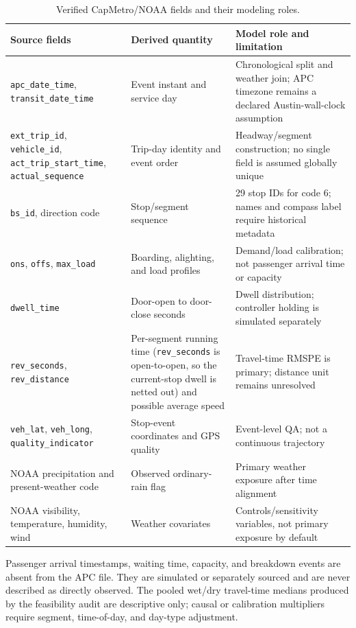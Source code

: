 \begin{table}[htbp]
\centering
\caption{Verified CapMetro/NOAA fields and their modeling roles.}
\label{tab:field-mapping-texas}
\small
\renewcommand{\arraystretch}{1.2}
\begin{tabularx}{\textwidth}{p{}p{}X}
\toprule
\textbf{Source fields} & \textbf{Derived quantity} & \textbf{Model role and limitation} \\
\midrule
\texttt{apc\_date\_time}, \texttt{transit\_date\_time} & Event instant and service day & Chronological split and weather join; APC timezone remains a declared Austin-wall-clock assumption \\
\texttt{ext\_trip\_id}, \texttt{vehicle\_id}, \texttt{act\_trip\_start\_time}, \texttt{actual\_sequence} & Trip-day identity and event order & Headway/segment construction; no single field is assumed globally unique \\
\texttt{bs\_id}, direction code & Stop/segment sequence & 29 stop IDs for code 6; names and compass label require historical metadata \\
\texttt{ons}, \texttt{offs}, \texttt{max\_load} & Boarding, alighting, and load profiles & Demand/load calibration; not passenger arrival time or capacity \\
\texttt{dwell\_time} & Door-open to door-close seconds & Dwell distribution; controller holding is simulated separately \\
\texttt{rev\_seconds}, \texttt{rev\_distance} & Per-segment running time (\texttt{rev\_seconds} is open-to-open, so the current-stop dwell is netted out) and possible average speed & Travel-time RMSPE is primary; distance unit remains unresolved \\
\texttt{veh\_lat}, \texttt{veh\_long}, \texttt{quality\_indicator} & Stop-event coordinates and GPS quality & Event-level QA; not a continuous trajectory \\
NOAA precipitation and present-weather code & Observed ordinary-rain flag & Primary weather exposure after time alignment \\
NOAA visibility, temperature, humidity, wind & Weather covariates & Controls/sensitivity variables, not primary exposure by default \\
\bottomrule
\end{tabularx}
\end{table}

Passenger arrival timestamps, waiting time, capacity, and breakdown events are absent from the APC file. They are simulated or separately sourced and are never described as directly observed. The pooled wet/dry travel-time medians produced by the feasibility audit are descriptive only; causal or calibration multipliers require segment, time-of-day, and day-type adjustment.

